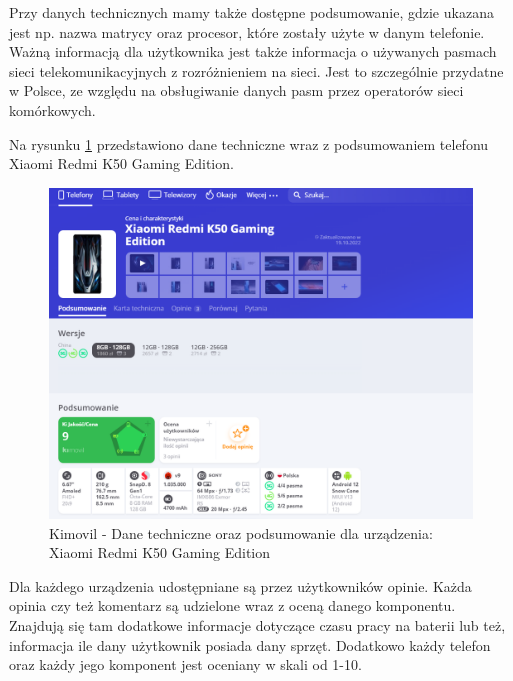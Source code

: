 Przy danych technicznych mamy także dostępne podsumowanie, gdzie ukazana jest np. nazwa matrycy oraz procesor, które zostały użyte w danym telefonie. Ważną informacją dla użytkownika jest także informacja o używanych pasmach sieci telekomunikacyjnych z rozróżnieniem na sieci. Jest to szczególnie przydatne w Polsce, ze względu na obsługiwanie danych pasm przez operatorów sieci komórkowych.

Na rysunku \ref*{kimovil_3} przedstawiono dane techniczne wraz z podsumowaniem telefonu Xiaomi Redmi K50 Gaming Edition.

\begin{figure}[H]
    \centering
    \includegraphics[scale=0.45]{img/Kimovil/kimovilDetails.png}
    \caption{Kimovil - Dane techniczne oraz podsumowanie dla urządzenia: Xiaomi Redmi K50 Gaming Edition}
    \label{kimovil_3}
\end{figure}

Dla każdego urządzenia udostępniane są przez użytkowników opinie. Każda opinia czy też komentarz są udzielone wraz z oceną danego komponentu. Znajdują się tam dodatkowe informacje dotyczące czasu pracy na baterii lub też, informacja ile dany użytkownik posiada dany sprzęt. Dodatkowo każdy telefon oraz każdy jego komponent jest oceniany w skali od 1-10.


